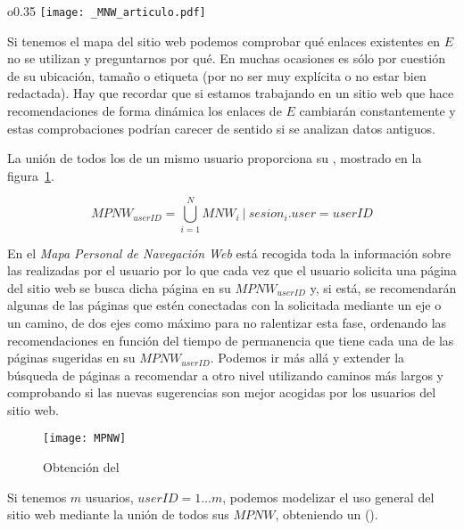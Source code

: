\begin{wrapfigure}{o}{0.35\textwidth}
  \centering
  \texttt{[image: \_MNW\_articulo.pdf]}
	\caption{\MNW}
\label{fig:1-3-1-MNW}
\end{wrapfigure}
Si tenemos el mapa del sitio web podemos comprobar qué enlaces existentes en $E$ no se utilizan y preguntarnos por qué. En muchas ocasiones es sólo por cuestión de su ubicación, tamaño o etiqueta (por no ser muy explícita o no estar bien redactada). Hay que recordar que si estamos trabajando en un sitio web que hace recomendaciones de forma dinámica los enlaces de $E$ cambiarán constantemente y estas comprobaciones podrían carecer de sentido si se analizan datos antiguos.

La unión de todos los \mnws de un mismo usuario proporciona su \mpnw, mostrado en la figura~\ref{fig:1-3-1-MPNW}.

\begin{defn}\label{def:1-3-1-MPNW}
  \begin{equation}
     \label{eq:1-MPNW}
     MPNW_{userID} = \bigcup_{i=1}^{N}{MNW_i}\ | \ {sesion}_i.user = userID 
  \end{equation}
\end{defn}


En el \emph{Mapa Personal de Navegación Web} está recogida toda la información sobre las \sns realizadas por el usuario por lo que cada vez que el usuario solicita una página del sitio web se busca dicha página en su ${MPNW}_{userID}$ y, si está, se recomendarán algunas de las páginas que estén conectadas con la solicitada mediante un eje o un camino, de dos ejes como máximo para no ralentizar esta fase, ordenando las recomendaciones en función del tiempo de permanencia que tiene cada una de las páginas sugeridas en su ${MPNW}_{userID}$. Podemos ir más allá y extender la búsqueda de páginas a recomendar a otro nivel utilizando caminos más largos y comprobando si las nuevas sugerencias son mejor acogidas por los usuarios del sitio web.

\begin{figure}[htbp]
  \centering
  \texttt{[image: MPNW]}
  \caption{Obtención del \MPNW}
\label{fig:1-3-1-MPNW}
\end{figure}





Si tenemos $m$ usuarios, $userID = 1\ldots m$, podemos modelizar el uso general del sitio web mediante la unión de todos sus $MPNW$, obteniendo un \musw (\MUSW).

